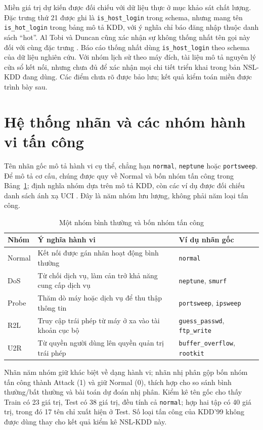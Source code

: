 \documentclass[../main.tex]{subfiles}
\begin{document}
Miền giá trị dự kiến được đối chiếu với dữ liệu thực ở mục khảo sát chất lượng. Đặc trưng thứ 21 được ghi là \texttt{is\_host\_login} trong schema, nhưng mang tên \texttt{is\_hot\_login} trong bảng mô tả KDD, với ý nghĩa chỉ báo đăng nhập thuộc danh sách ``hot''. Al Tobi và Duncan cũng xác nhận sự không thống nhất tên gọi này đối với cùng đặc trưng \cite{task2_kdd1999,task1_schema1999,task2_altobi2018}. Báo cáo thống nhất dùng \texttt{is\_host\_login} theo schema của dữ liệu nghiên cứu. Với nhóm lịch sử theo máy đích, tài liệu mô tả nguyên lý cửa sổ kết nối, nhưng chưa đủ để xác nhận mọi chi tiết triển khai trong bản NSL-KDD đang dùng. Các điểm chưa rõ được bảo lưu; kết quả kiểm toán miền được trình bày sau.

\section{Hệ thống nhãn và các nhóm hành vi tấn công}
Tên nhãn gốc mô tả hành vi cụ thể, chẳng hạn \texttt{normal}, \texttt{neptune} hoặc \texttt{portsweep}. Để mô tả cơ cấu, chúng được quy về Normal và bốn nhóm tấn công trong Bảng~\ref{tab:chuong2:taxonomy}; định nghĩa nhóm dựa trên mô tả KDD, còn các ví dụ được đối chiếu danh sách ánh xạ UCI \cite{task2_kdd1999,task2_uci1999}. Đây là năm nhóm lưu lượng, không phải năm loại tấn công.
\begin{table}[H]\centering
\caption{Một nhóm bình thường và bốn nhóm tấn công}
\label{tab:chuong2:taxonomy}
\small\setlength{\tabcolsep}{4pt}
\begin{tabular}{l>{\raggedright\arraybackslash}p{7.3cm}>{\raggedright\arraybackslash}p{5.5cm}}\toprule
Nhóm & Ý nghĩa hành vi & Ví dụ nhãn gốc\\\midrule
Normal & Kết nối được gán nhãn hoạt động bình thường & \texttt{normal}\\
DoS & Từ chối dịch vụ, làm cản trở khả năng cung cấp dịch vụ & \texttt{neptune}, \texttt{smurf}\\
Probe & Thăm dò máy hoặc dịch vụ để thu thập thông tin & \texttt{portsweep}, \texttt{ipsweep}\\
R2L & Truy cập trái phép từ máy ở xa vào tài khoản cục bộ & \texttt{guess\_passwd}, \texttt{ftp\_write}\\
U2R & Từ quyền người dùng lên quyền quản trị trái phép & \texttt{buffer\_overflow}, \texttt{rootkit}\\
\bottomrule\end{tabular}\end{table}
Nhãn năm nhóm giữ khác biệt về dạng hành vi; nhãn nhị phân gộp bốn nhóm tấn công thành Attack (1) và giữ Normal (0), thích hợp cho so sánh bình thường/bất thường và bài toán dự đoán nhị phân. Kiểm kê tên gốc cho thấy Train có 23 giá trị, Test có 38 giá trị, đều tính cả \texttt{normal}; hợp hai tập có 40 giá trị, trong đó 17 tên chỉ xuất hiện ở Test. Số loại tấn công của KDD'99 không được dùng thay cho kết quả kiểm kê NSL-KDD này.
\end{document}
